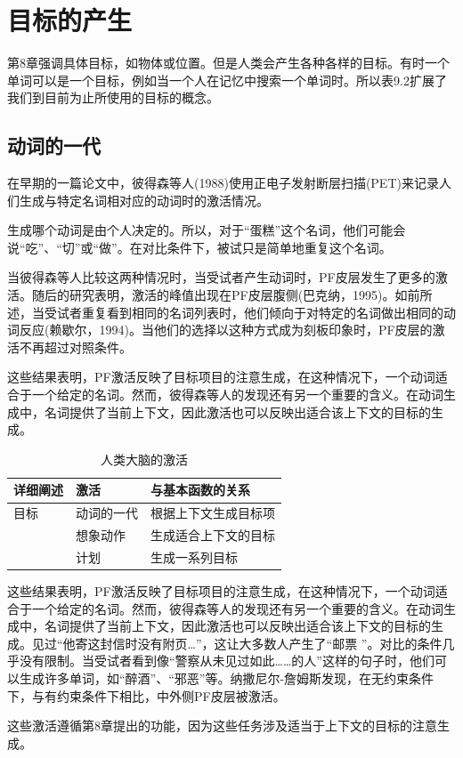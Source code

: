 \section{目标的产生}
\par
第8章强调具体目标，如物体或位置。但是人类会产生各种各样的目标。有时一个单词可以是一个目标，例如当一个人在记忆中搜索一个单词时。所以表9.2扩展了我们到目前为止所使用的目标的概念。
\subsection{动词的一代}
\par
在早期的一篇论文中，彼得森等人(1988)使用正电子发射断层扫描(PET)来记录人们生成与特定名词相对应的动词时的激活情况。
\par
生成哪个动词是由个人决定的。所以，对于“蛋糕”这个名词，他们可能会说“吃”、“切”或“做”。在对比条件下，被试只是简单地重复这个名词。
\par
当彼得森等人比较这两种情况时，当受试者产生动词时，PF皮层发生了更多的激活。随后的研究表明，激活的峰值出现在PF皮层腹侧(巴克纳，1995)。如前所述，当受试者重复看到相同的名词列表时，他们倾向于对特定的名词做出相同的动词反应(赖歇尔，1994)。当他们的选择以这种方式成为刻板印象时，PF皮层的激活不再超过对照条件。
\par
这些结果表明，PF激活反映了目标项目的注意生成，在这种情况下，一个动词适合于一个给定的名词。然而，彼得森等人的发现还有另一个重要的含义。在动词生成中，名词提供了当前上下文，因此激活也可以反映出适合该上下文的目标的生成。
\par
\begin{table}[htbp] 
	\newcommand{\tabincell}[2]{\begin{tabular}{@{}#1@{}}#2\end{tabular}} %
	\centering
	\caption{人类大脑的激活\label{tab:9_2}}
	\renewcommand\arraystretch{1.5}	%
	\begin{tabular}{lll}
		\toprule
		详细阐述 & 激活 & 与基本函数的关系\\
		\midrule
		目标 & 动词的一代 & 根据上下文生成目标项  \\
		& 想象动作 & 生成适合上下文的目标 \\
		&  计划 & 生成一系列目标 \\
		\bottomrule
		
	\end{tabular}%
\end{table}%

这些结果表明，PF激活反映了目标项目的注意生成，在这种情况下，一个动词适合于一个给定的名词。然而，彼得森等人的发现还有另一个重要的含义。在动词生成中，名词提供了当前上下文，因此激活也可以反映出适合该上下文的目标的生成。见过“他寄这封信时没有附页…”，这让大多数人产生了“邮票 ”。对比的条件几乎没有限制。当受试者看到像“警察从未见过如此……的人”这样的句子时，他们可以生成许多单词，如“醉酒”、“邪恶”等。纳撒尼尔-詹姆斯发现，在无约束条件下，与有约束条件下相比，中外侧PF皮层被激活。
\par
这些激活遵循第8章提出的功能，因为这些任务涉及适当于上下文的目标的注意生成。

